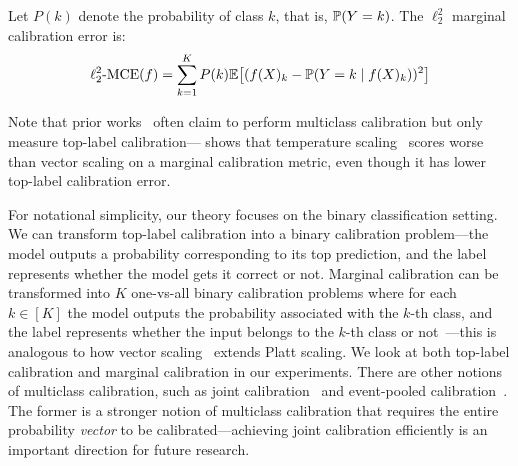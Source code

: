 \begin{definition}
\label{dfn:marginal-ce}
Let $P(k)$ denote the probability of class $k$, that is, $\mathbb{P}(Y = k)$. The $\ell_2^2$ marginal calibration error is:
\begin{align}
\ell_2^2\mbox{-MCE}(f) = \sum_{k = 1}^K P(k) \mathbb{E}\big[ (f(X)_k - \mathbb{P}(Y = k \mid f(X)_k))^2 \big]
\end{align}
\end{definition}

Note that prior works~\cite{guo2017calibration, hendrycks2019anomaly, hendrycks2019pretraining} often claim to perform multiclass calibration but only measure top-label calibration---\cite{nixon2019calibration} shows that temperature scaling~\cite{guo2017calibration} scores worse than vector scaling on a marginal calibration metric, even though it has lower top-label calibration error.



For notational simplicity, our theory focuses on the binary classification setting. We can transform top-label calibration into a binary calibration problem---the model outputs a probability corresponding to its top prediction, and the label represents whether the model gets it correct or not. Marginal calibration can be transformed into $K$ one-vs-all binary calibration problems where for each $k \in [K]$ the model outputs the probability associated with the $k$-th class, and the label represents whether the input belongs to the $k$-th class or not~\cite{zadrozny2002transforming}---this is analogous to how vector scaling~\cite{guo2017calibration} extends Platt scaling. We look at both top-label calibration and marginal calibration in our experiments. There are other notions of multiclass calibration, such as joint calibration~\cite{murphy1973vector, brocker2009decomposition} and event-pooled calibration~\cite{kuleshov2015calibrated}. The former is a stronger notion of multiclass calibration that requires the entire probability \emph{vector} to be calibrated---achieving joint calibration efficiently is an important direction for future research.



